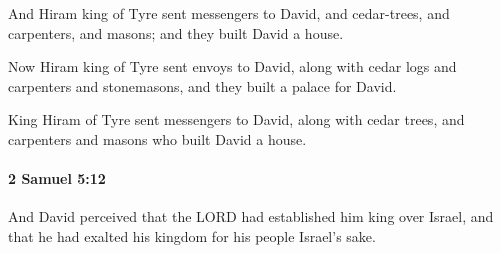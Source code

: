			\begin{versebox}
					\item[BHS] 
					\item[ASV] And Hiram king of Tyre sent messengers to David, and cedar-trees, and carpenters, and masons; and they built David a house.
					\item[NIV] Now Hiram king of Tyre sent envoys to David, along with cedar logs and carpenters and stonemasons, and they built a palace for David.
					\item[NRSV] King Hiram of Tyre sent messengers to David, along with cedar trees, and carpenters and masons who built David a house.
			\end{versebox}

		\paragraph{2 Samuel 5:12} %
			\label{2SAMUEL-5-12}

			And David perceived that the LORD had established him king over Israel, and that he had exalted his kingdom for his people Israel’s sake.

